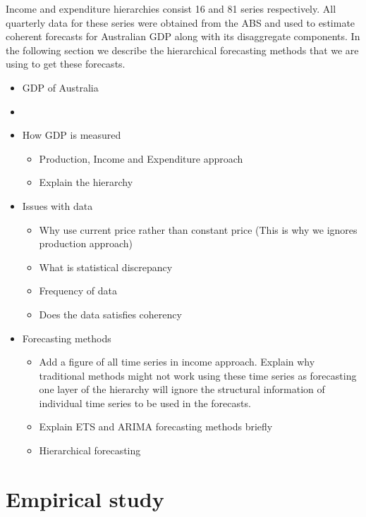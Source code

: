 \documentclass[graybox]{svmult}
\begin{document}
Income and expenditure hierarchies consist 16 and 81 series respectively. All quarterly data for these series were obtained from the ABS and used to estimate coherent forecasts for Australian GDP along with its disaggregate components. In the following section we describe the hierarchical forecasting methods that we are using to get these forecasts.

\begin{itemize}
	\item GDP of Australia
	\item []
	\item How GDP is measured
		\begin{itemize}
			\item Production, Income and Expenditure approach
			\item Explain the hierarchy
		\end{itemize}
	\item Issues with data
		\begin{itemize}
			\item Why use current price rather than constant price (This is why we ignores production approach)
			\item What is statistical discrepancy
			\item Frequency of data
			\item Does the data satisfies coherency
		\end{itemize}
	
	\item Forecasting methods
		\begin{itemize}
			\item Add a figure of all time series in income approach.
			Explain why traditional methods might not work using these time series as forecasting one layer of the hierarchy will ignore the structural information of individual time series to be used in the forecasts.
			
			\item Explain ETS and ARIMA forecasting methods briefly
			\item Hierarchical forecasting
		\end{itemize}
\end{itemize}


\clearpage	







\section{Empirical study}
\end{document}
